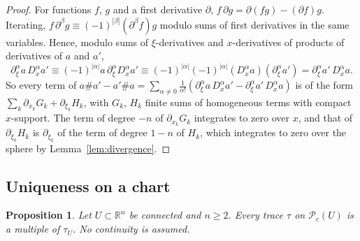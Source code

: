 \documentclass[11pt,oneside,reqno]{article}
\newcommand{\R}{\mathbb R}
\newcommand{\cP}{\mathcal P}
\newcommand{\pa}{\partial}
\theoremstyle{plain}
\newtheorem{proposition}[theorem]{Proposition}
\theoremstyle{definition}
\theoremstyle{remark}
\begin{document}
\begin{proof}
For functions \(f\), \(g\) and a first derivative \(\pa\), \(f\,\pa g=\pa(fg)-(\pa f)g\). Iterating,
\(f\,\pa^\beta g\equiv(-1)^{|\beta|}(\pa^\beta f)g\) modulo sums of first derivatives in the same
variables. Hence, modulo sums of \(\xi\)-derivatives and \(x\)-derivatives of products
of derivatives of \(a\) and \(a'\),
\[
 \pa_\xi^\alpha a\,D_x^\alpha a'\equiv(-1)^{|\alpha|}a\,\pa_\xi^\alpha D_x^\alpha a'\equiv
 (-1)^{|\alpha|}(-1)^{|\alpha|}(D_x^\alpha a)(\pa_\xi^\alpha a')=\pa_\xi^\alpha a'\,D_x^\alpha a .
\]
So every term of \(a\#a'-a'\#a=\sum_{\alpha\ne0}\frac1{\alpha!}(\pa_\xi^\alpha a\,D_x^\alpha a'-
\pa_\xi^\alpha a'\,D_x^\alpha a)\) is of the form \(\sum_k\pa_{x_k}G_k+\pa_{\xi_k}H_k\), with \(G_k\), \(H_k\)
finite sums of homogeneous terms with compact \(x\)-support. The term of degree \(-n\)
of \(\pa_{x_k}G_k\) integrates to zero over \(x\), and that of \(\pa_{\xi_k}H_k\) is
\(\pa_{\xi_k}\) of the term of degree \(1-n\) of \(H_k\), which integrates to zero over the sphere
by Lemma~\ref{lem:divergence}.
\end{proof}

\subsection{Uniqueness on a chart}\label{subsec:uniquechart}

\begin{proposition}\label{prop:uniquechart}
Let \(U\subset\R^n\) be connected and \(n\ge2\). Every trace \(\tau\) on \(\cP_c(U)\) is a multiple of
\(\tau_U\). No continuity is assumed.
\end{proposition}
\end{document}
